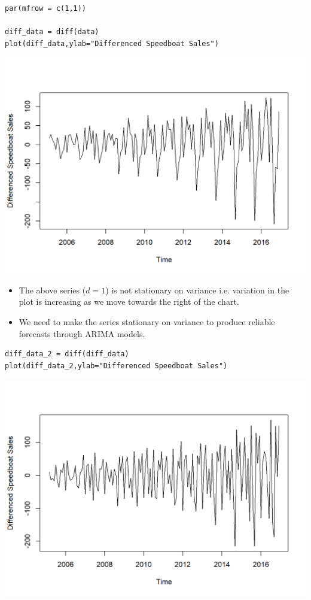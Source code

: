 \documentclass[a4paper,12pt]{article}
\begin{document}
\begin{framed}
\begin{verbatim}
par(mfrow = c(1,1))

diff_data = diff(data)
plot(diff_data,ylab="Differenced Speedboat Sales")
\end{verbatim}
\end{framed}
\includegraphics[]{00-B2/images/Speedboat_3.png}
\newpage
\begin{itemize}
    \item The above series ($d=1$) is not stationary on variance i.e. variation in the plot is increasing as we move towards the right of the chart. 
\item We need to make the series stationary on variance to produce reliable
forecasts through ARIMA models.
\end{itemize}

\newpage 

\begin{framed}
\begin{verbatim}
diff_data_2 = diff(diff_data)
plot(diff_data_2,ylab="Differenced Speedboat Sales")
\end{verbatim}
\end{framed}
\includegraphics[]{00-B2/images/Speedboat_4.png}
\end{document}
